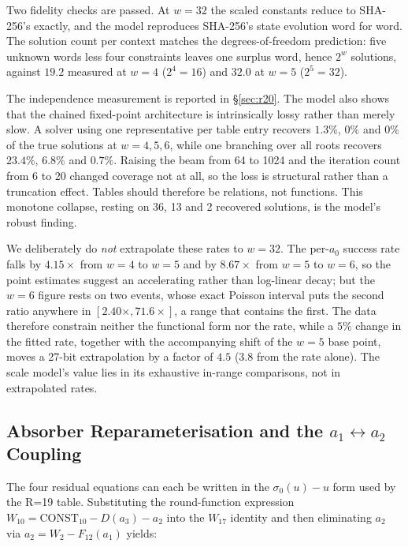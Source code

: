 \documentclass[11pt,a4paper]{article}
\newcommand{\sig}[1]{\sigma_{#1}}
\begin{document}
Two fidelity checks are passed.  At $w=32$ the scaled constants reduce to
SHA-256's exactly, and the model reproduces SHA-256's state evolution
word for word.  The solution count per context matches the degrees-of-freedom
prediction: five unknown words less four constraints leaves one surplus word,
hence $2^w$ solutions, against $19.2$ measured at $w=4$ ($2^4=16$) and $32.0$
at $w=5$ ($2^5=32$).

The independence measurement is reported in \S\ref{sec:r20}.  The model also
shows that the chained fixed-point architecture is intrinsically lossy rather
than merely slow.  A solver using one representative per table entry recovers
$1.3\%$, $0\%$ and $0\%$ of the true solutions at $w=4,5,6$, while one
branching over all roots recovers $23.4\%$, $6.8\%$ and $0.7\%$.  Raising the
beam from 64 to 1024 and the iteration count from 6 to 20 changed coverage not
at all, so the loss is structural rather than a truncation effect.  Tables
should therefore be relations, not functions.  This monotone collapse, resting
on 36, 13 and 2 recovered solutions, is the model's robust finding.

We deliberately do \emph{not} extrapolate these rates to $w=32$.  The
per-$a_0$ success rate falls by $4.15\times$ from $w=4$ to $w=5$ and by
$8.67\times$ from $w=5$ to $w=6$, so the point estimates suggest an
accelerating rather than log-linear decay; but the $w=6$ figure rests on two
events, whose exact Poisson interval puts the second ratio anywhere in
$[2.40\times, 71.6\times]$, a range that contains the first.  The data
therefore constrain neither the functional form nor the rate, while a $5\%$
change in the fitted rate, together with the accompanying shift of the
$w=5$ base point, moves a 27-bit extrapolation by a factor of $4.5$
($3.8$ from the rate alone).  The scale model's value lies in its
exhaustive in-range comparisons, not in extrapolated rates.

\subsection{Absorber Reparameterisation and the \texorpdfstring{$a_1\!\leftrightarrow\!a_2$}{a1-a2} Coupling}
\label{sec:ureparam}

The four residual equations can each be written in the $\sig{0}(u)-u$ form used
by the R=19 table.  Substituting the round-function expression
$W_{10} = \mathrm{CONST}_{10} - D(a_3) - a_2$ into the $W_{17}$ identity and then
eliminating $a_2$ via $a_2 = W_2 - F_{12}(a_1)$ yields:
\end{document}
